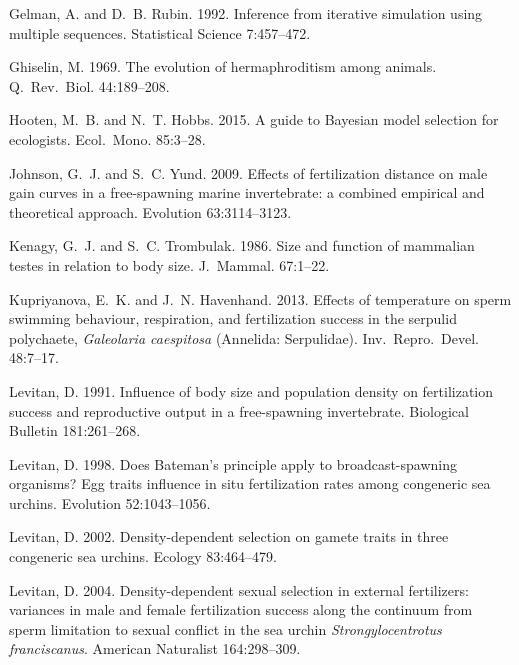\documentclass{article}
\begin{document}
\begin{thebibliography}{}
Gelman, A. and D.~B. Rubin. 1992.
\newblock Inference from iterative simulation using multiple sequences.
\newblock Statistical Science 7:457--472.

Ghiselin, M. 1969.
\newblock The evolution of hermaphroditism among animals.
\newblock Q.~Rev.~Biol. 44:189--208.

Hooten, M.~B. and N.~T. Hobbs. 2015.
\newblock A guide to Bayesian model selection for ecologists.
\newblock Ecol.~Mono. 85:3--28.

Johnson, G.~J. and S.~C. Yund. 2009.
\newblock Effects of fertilization distance on male gain curves in a free-spawning marine invertebrate: a combined empirical and theoretical approach.
\newblock Evolution 63:3114--3123.

Kenagy, G.~J. and S.~C. Trombulak. 1986.
\newblock Size and function of mammalian testes in relation to body size.
\newblock J.~Mammal. 67:1--22.

Kupriyanova, E.~K. and J.~N. Havenhand. 2013.
\newblock Effects of temperature on sperm swimming behaviour, respiration, and fertilization success in the serpulid polychaete, \textit{Galeolaria caespitosa} (Annelida: Serpulidae).
\newblock Inv.~Repro.~Devel. 48:7--17.

Levitan, D. 1991.
\newblock Influence of body size and population density on fertilization success and reproductive output in a free-spawning invertebrate.
\newblock Biological Bulletin 181:261--268.

Levitan, D. 1998.
\newblock Does Bateman's principle apply to broadcast-spawning organisms? Egg traits influence in situ fertilization rates among congeneric sea urchins.
\newblock Evolution 52:1043--1056.

Levitan, D. 2002.
\newblock Density-dependent selection on gamete traits in three congeneric sea urchins.
\newblock Ecology 83:464--479.

Levitan, D. 2004.
\newblock Density-dependent sexual selection in external fertilizers: variances in male and female fertilization success along the continuum from sperm limitation to sexual conflict in the sea urchin \textit{Strongylocentrotus franciscanus}.
\newblock American Naturalist 164:298--309.


\end{thebibliography}
\end{document}
